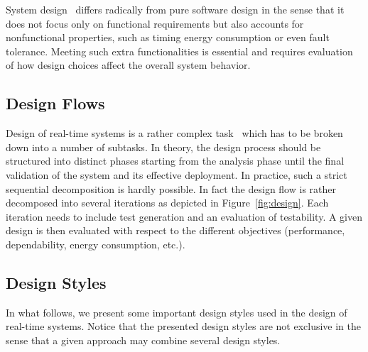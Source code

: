System design~\cite{intro:sys_design} differs radically from pure software design in the sense
that it does not focus only on functional requirements but also accounts for nonfunctional 
properties, such as timing energy consumption or even fault tolerance. Meeting such 
extra functionalities is essential and requires evaluation of how design choices affect 
the overall system behavior. 

\subsection{Design Flows}
Design of real-time systems is a rather complex task~\cite{intro:sys_design2} which has to be 
broken down into a number of subtasks. In theory, the design process should be structured into
distinct phases starting from the analysis phase until the final validation of the system and 
its effective deployment. In practice, such a strict sequential decomposition 
is hardly possible.
In fact the design flow is rather decomposed into several iterations as depicted in 
Figure~\ref{fig:design}. Each iteration needs to include test generation and an evaluation 
of testability. A given design is then evaluated with respect to the different objectives 
(performance, dependability, energy consumption, etc.). 


\subsection{Design Styles}

In what follows, we present some important design styles used in the design of real-time systems.
Notice that the presented design styles are not exclusive in the sense that a given approach
may combine several design styles.

